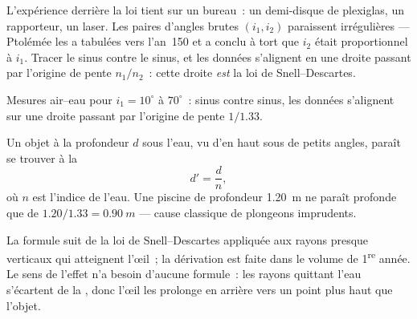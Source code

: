 L'expérience derrière la loi tient sur un bureau~: un demi-disque de
plexiglas, un rapporteur, un laser. Les paires d'angles brutes
$(i_1, i_2)$ paraissent irrégulières --- Ptolémée les a tabulées vers
l'an~150 et a conclu à tort que $i_2$ était proportionnel à $i_1$.
Tracer le sinus contre le sinus, et les données s'alignent en une
droite passant par l'origine de pente $n_1/n_2$~: cette droite \emph{est}
la loi de Snell--Descartes.

\begin{omfigure}

{\small Mesures air--eau pour $i_1 = 10^\circ$ à $70^\circ$~: sinus contre
sinus, les données s'alignent sur une droite passant par l'origine de
pente $1/1.33$.}
\end{omfigure}

\begin{proposition}\label{prop:g10:refraction:depth}
Un objet à la profondeur $d$ sous l'eau, vu d'en haut sous de petits
angles, paraît se trouver à la \emph{}
\[
d' = \frac{d}{n} ,
\]
où $n$ est l'indice de l'eau. Une piscine de profondeur \qty{1.20}{m}
ne paraît profonde que de $1.20/1.33 = \qty{0.90}{m}$ --- cause
classique de plongeons imprudents.
\end{proposition}
\admitted

\begin{remark}\label{rem:g10:refraction:depthhonest}
La formule suit de la loi de Snell--Descartes appliquée aux
rayons presque verticaux qui atteignent l'œil~; la dérivation est faite
dans le volume de 1\textsuperscript{re} année. Le sens de l'effet n'a
besoin d'aucune formule~: les rayons quittant l'eau s'écartent de la
, donc l'œil les prolonge en arrière vers un point plus
haut que l'objet.
\end{remark}

